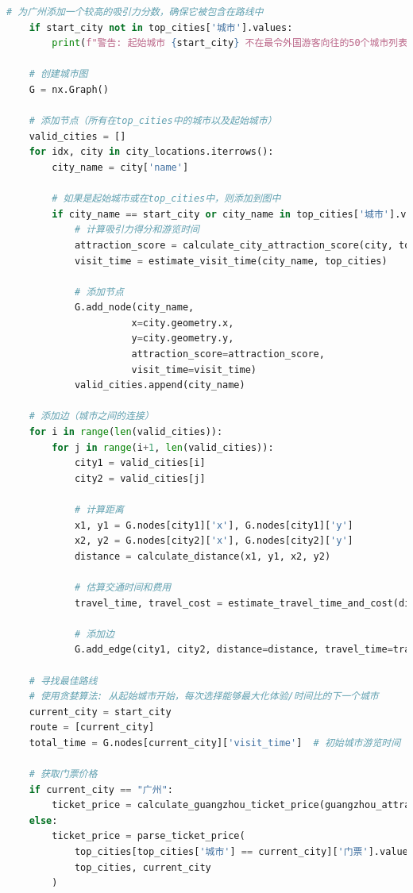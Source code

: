 \documentclass[withoutpreface,bwprint]{cumcmthesis} %
\begin{document}
\begin{appendices}
\begin{lstlisting}[language=python]
    # 为广州添加一个较高的吸引力分数，确保它被包含在路线中
    if start_city not in top_cities['城市'].values:
        print(f"警告: 起始城市 {start_city} 不在最令外国游客向往的50个城市列表中")
    
    # 创建城市图
    G = nx.Graph()
    
    # 添加节点（所有在top_cities中的城市以及起始城市）
    valid_cities = []
    for idx, city in city_locations.iterrows():
        city_name = city['name']
        
        # 如果是起始城市或在top_cities中，则添加到图中
        if city_name == start_city or city_name in top_cities['城市'].values:
            # 计算吸引力得分和游览时间
            attraction_score = calculate_city_attraction_score(city, top_cities)
            visit_time = estimate_visit_time(city_name, top_cities)
            
            # 添加节点
            G.add_node(city_name, 
                      x=city.geometry.x, 
                      y=city.geometry.y, 
                      attraction_score=attraction_score,
                      visit_time=visit_time)
            valid_cities.append(city_name)
    
    # 添加边（城市之间的连接）
    for i in range(len(valid_cities)):
        for j in range(i+1, len(valid_cities)):
            city1 = valid_cities[i]
            city2 = valid_cities[j]
            
            # 计算距离
            x1, y1 = G.nodes[city1]['x'], G.nodes[city1]['y']
            x2, y2 = G.nodes[city2]['x'], G.nodes[city2]['y']
            distance = calculate_distance(x1, y1, x2, y2)
            
            # 估算交通时间和费用
            travel_time, travel_cost = estimate_travel_time_and_cost(distance)
            
            # 添加边
            G.add_edge(city1, city2, distance=distance, travel_time=travel_time, travel_cost=travel_cost)
    
    # 寻找最佳路线
    # 使用贪婪算法: 从起始城市开始，每次选择能够最大化体验/时间比的下一个城市
    current_city = start_city
    route = [current_city]
    total_time = G.nodes[current_city]['visit_time']  # 初始城市游览时间
    
    # 获取门票价格
    if current_city == "广州":
        ticket_price = calculate_guangzhou_ticket_price(guangzhou_attractions)
    else:
        ticket_price = parse_ticket_price(
            top_cities[top_cities['城市'] == current_city]['门票'].values[0] if current_city in top_cities['城市'].values else None,
            top_cities, current_city
        )
        

\end{lstlisting}
\end{appendices}
\end{document}
